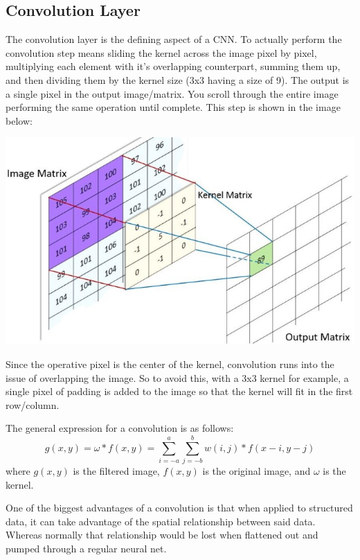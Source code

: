 \documentclass{article}
\begin{document}
    \subsection{Convolution Layer}
        The convolution layer is the defining aspect of a CNN. To actually perform the convolution step means sliding the kernel across the image pixel by pixel, multiplying each element with it's overlapping counterpart, summing them up, and then dividing them by the kernel size (3x3 having a size of 9). The output is a single pixel in the output image/matrix. You scroll through the entire image performing the same operation until complete. This step is shown in the image below:
        
        \begin{center}
            \includegraphics[scale=0.6]{images/kernel.jpg}
        \end{center}
        
        Since the operative pixel is the center of the kernel, convolution runs into the issue of overlapping the image. So to avoid this, with a 3x3 kernel for example, a single pixel of padding is added to the image so that the kernel will fit in the first row/column.

        The general expression for a convolution is as follows:
        \[ g(x, y) = \omega \ast f(x, y) = \sum_{i=-a}^{a} \sum_{j=-b}^{b} w(i, j) * f(x - i, y - j) \]
        where $g(x, y)$ is the filtered image, $f(x, y)$ is the original image, and $\omega$ is the kernel.

        One of the biggest advantages of a convolution is that when applied to structured data, it can take advantage of the spatial relationship between said data. Whereas normally that relationship would be lost when flattened out and pumped through a regular neural net.
\end{document}
